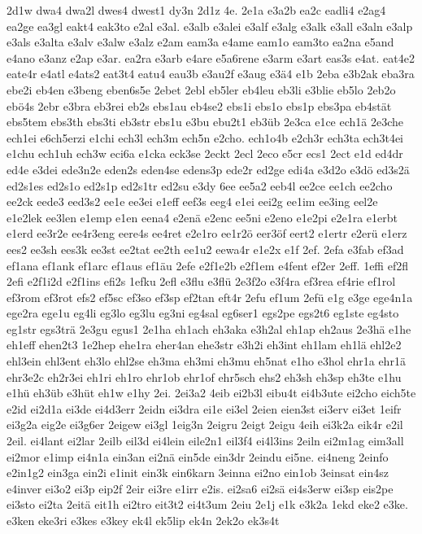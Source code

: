 {2d1w
dwa4
dwa2l
dwes4
dwest1
dy3n
2d1z
4e.
2e1a
e3a2b
ea2c
eadli4
e2ag4
ea2ge
ea3gl
eakt4
eak3to
e2al
e3al.
e3alb
e3alei
e3alf
e3alg
e3alk
e3all
e3aln
e3alp
e3als
e3alta
e3alv
e3alw
e3alz
e2am
eam3a
e4ame
eam1o
eam3to
ea2na
e5and
e4ano
e3anz
e2ap
e3ar.
ea2ra
e3arb
e4are
e5a6rene
e3arm
e3art
eas3s
e4at.
eat4e2
eate4r
e4atl
e4ats2
eat3t4
eatu4
eau3b
e3au2f
e3aug
e3ä4
e1b
2eba
e3b2ak
eba3ra
ebe2i
eb4en
e3beng
eben6s5e
2ebet
2ebl
eb5ler
eb4leu
eb3li
e3blie
eb5lo
2eb2o
ebö4s
2ebr
e3bra
eb3rei
eb2s
ebs1au
eb4se2
ebs1i
ebs1o
ebs1p
ebs3pa
eb4stät
ebs5tem
ebs3th
ebs3ti
eb3str
ebs1u
e3bu
ebu2t1
eb3üb
2e3ca
e1ce
ech1ä
2e3che
ech1ei
e6ch5erzi
e1chi
ech3l
ech3m
ech5n
e2cho.
ech1o4b
e2ch3r
ech3ta
ech3t4ei
e1chu
ech1uh
ech3w
eci6a
e1cka
eck3se
2eckt
2ecl
2eco
e5cr
ecs1
2ect
e1d
ed4dr
ed4e
e3dei
ede3n2e
eden2s
eden4se
edens3p
ede2r
ed2ge
edi4a
e3d2o
e3dö
ed3s2ä
ed2s1es
ed2s1o
ed2s1p
ed2s1tr
ed2su
e3dy
6ee
ee5a2
eeb4l
ee2ce
ee1ch
ee2cho
ee2ck
eede3
eed3s2
ee1e
ee3ei
e1eff
eef3s
eeg4
e1ei
eei2g
ee1im
ee3ing
eel2e
e1e2lek
ee3len
e1emp
e1en
eena4
e2enä
e2enc
ee5ni
e2eno
e1e2pi
e2e1ra
e1erbt
e1erd
ee3r2e
ee4r3eng
eere4s
ee4ret
e2e1ro
ee1r2ö
eer3öf
eert2
e1ertr
e2erü
e1erz
ees2
ee3sh
ees3k
ee3st
ee2tat
ee2th
ee1u2
eewa4r
e1e2x
e1f
2ef.
2efa
e3fab
ef3ad
ef1ana
ef1ank
ef1arc
ef1aus
ef1äu
2efe
e2f1e2b
e2f1em
e4fent
ef2er
2eff.
1effi
ef2fl
2efi
e2f1i2d
e2f1ins
efi2s
1efku
2efl
e3flu
e3flü
2e3f2o
e3f4ra
ef3rea
ef4rie
ef1rol
ef3rom
ef3rot
efs2
ef5sc
ef3so
ef3sp
ef2tan
eft4r
2efu
ef1um
2efü
e1g
e3ge
ege4n1a
ege2ra
ege1u
eg4li
eg3lo
eg3lu
eg3ni
eg4sal
eg6ser1
egs2pe
egs2t6
eg1ste
eg4sto
eg1str
egs3trä
2e3gu
egus1
2e1ha
eh1ach
eh3aka
e3h2al
eh1ap
eh2aus
2e3hä
e1he
eh1eff
ehen2t3
1e2hep
ehe1ra
eher4an
ehe3str
e3h2i
eh3int
eh1lam
eh1lä
ehl2e2
ehl3ein
ehl3ent
eh3lo
ehl2se
eh3ma
eh3mi
eh3mu
eh5nat
e1ho
e3hol
ehr1a
ehr1ä
ehr3e2c
eh2r3ei
eh1ri
eh1ro
ehr1ob
ehr1of
ehr5sch
ehs2
eh3sh
eh3sp
eh3te
e1hu
e1hü
eh3üb
e3hüt
eh1w
e1hy
2ei.
2ei3a2
4eib
ei2b3l
eibu4t
ei4b3ute
ei2cho
eich5te
e2id
ei2d1a
ei3de
ei4d3err
2eidn
ei3dra
ei1e
ei3el
2eien
eien3st
ei3erv
ei3et
1eifr
ei3g2a
eig2e
ei3g6er
2eigew
ei3gl
1eig3n
2eigru
2eigt
2eigu
4eih
ei3k2a
eik4r
e2il
2eil.
ei4lant
ei2lar
2eilb
eil3d
ei4lein
eile2n1
eil3f4
ei4l3ins
2eiln
ei2m1ag
eim3all
ei2mor
e1imp
ei4n1a
ein3an
ei2nä
ein5de
ein3dr
2eindu
ei5ne.
ei4neng
2einfo
e2in1g2
ein3ga
ein2i
e1init
ein3k
ein6karn
3einna
ei2no
ein1ob
3einsat
ein4sz
e4inver
ei3o2
ei3p
eip2f
2eir
ei3re
e1irr
e2is.
ei2sa6
ei2sä
ei4s3erw
ei3sp
eis2pe
ei3sto
ei2ta
2eitä
eit1h
ei2tro
eit3t2
ei4t3um
2eiu
2e1j
e1k
e3k2a
1ekd
eke2
e3ke.
e3ken
eke3ri
e3kes
e3key
ek4l
ek5lip
ek4n
2ek2o
ek3s4t
}
